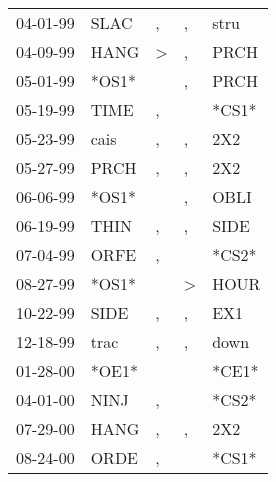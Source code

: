 \begin{supertabular}{lllll}
 04-01-99 &   SLAC &             , &             , &   stru \\
 04-09-99 &   HANG &  \textgreater &             , &   PRCH \\
 05-01-99 &  *OS1* &               &             , &   PRCH \\
 05-19-99 &   TIME &             , &               &  *CS1* \\
 05-23-99 &   cais &             , &             , &    2X2 \\
 05-27-99 &   PRCH &             , &             , &    2X2 \\
 06-06-99 &  *OS1* &               &             , &   OBLI \\
 06-19-99 &   THIN &             , &             , &   SIDE \\
 07-04-99 &   ORFE &             , &               &  *CS2* \\
 08-27-99 &  *OS1* &               &  \textgreater &   HOUR \\
 10-22-99 &   SIDE &             , &             , &    EX1 \\
 12-18-99 &   trac &             , &             , &   down \\
 01-28-00 &  *OE1* &               &               &  *CE1* \\
 04-01-00 &   NINJ &             , &               &  *CS2* \\
 07-29-00 &   HANG &             , &             , &    2X2 \\
 08-24-00 &   ORDE &             , &               &  *CS1* \\
\end{supertabular}
